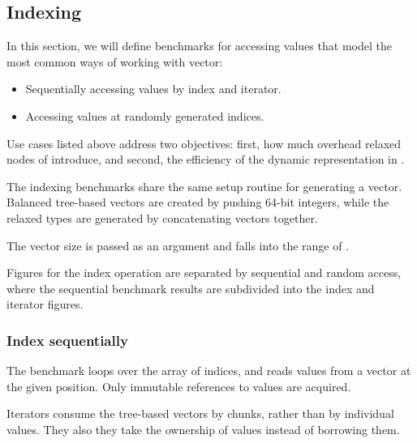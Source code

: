 \subsection{Indexing}
In this section, we will define benchmarks for accessing values that model the most common ways of working with vector:

\begin{itemize}
    \item Sequentially accessing values by index and iterator.
    \item Accessing values at randomly generated indices.
\end{itemize}

Use cases listed above address two objectives: first, how much overhead relaxed nodes of \rrbtree{} introduce, and second, the efficiency of the dynamic representation in \pvec{}.

The indexing benchmarks share the same setup routine for generating a vector. Balanced tree-based vectors are created by pushing 64-bit integers, while the relaxed types are generated by concatenating vectors together.

The vector size is passed as an argument and falls into the range of \range{[20, \mega{1}]}.

Figures for the index operation are separated by sequential and random access, where the sequential benchmark results are subdivided into the index and iterator figures.

\subsubsection*{Index sequentially}
The benchmark loops over the array of \range{[0, N)} indices, and reads values from a vector at the given position. Only immutable references to values are acquired.

Iterators consume the tree-based vectors by chunks, rather than by individual values. They also they take the ownership of values instead of borrowing them.

